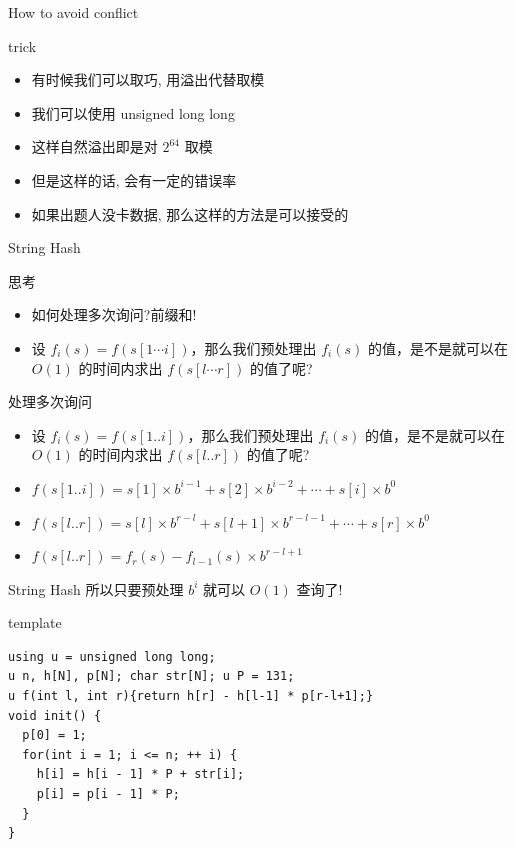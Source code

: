 \documentclass{ldr-simple-gray}
\begin{document}
  \begin{frame}{How to avoid conflict}
    \begin{block}{trick}
      \begin{itemize}
        \item 有时候我们可以取巧, 用溢出代替取模
        \item 我们可以使用 unsigned long long
        \item 这样自然溢出即是对 $2^{64}$ 取模
        \item 但是这样的话, 会有一定的错误率
        \item 如果出题人没卡数据, 那么这样的方法是可以接受的
      \end{itemize}
    \end{block}
  \end{frame}

  \begin{frame}{String Hash}
    \begin{block}{思考}
      \begin{itemize}
        \item 如何处理多次询问?前缀和!
        \item 设 $f_{i}(s)=f(s[1\cdots i])$，那么我们预处理出 $f_{i}(s)$ 的值，是不是就可以在 $O(1)$ 的时间内求出 $f(s[l\cdots r])$ 的值了呢?
      \end{itemize}
    \end{block}

    \begin{block}{处理多次询问}
      \begin{itemize}
        \item 设 $f_{i}(s)=f(s[1..i])$，那么我们预处理出 $f_{i}(s)$ 的值，是不是就可以在 $O(1)$ 的时间内求出 $f(s[l..r])$ 的值了呢?
        \item $f(s[1..i])=s[1]\times{b^{i-1}}+s[2]\times{b^{i-2}}+\cdots+s[i]\times{b^{0}}$
        \item $f(s[l..r])=s[l]\times{b^{r-l}}+s[l+1]\times{b^{r-l-1}}+\cdots+s[r]\times{b^{0}}$
        \item $f(s[l..r])=f_{r}(s)-f_{l-1}(s)\times{b^{r-l+1}}$
      \end{itemize}
    \end{block}
  \end{frame}

  \begin{frame}[fragile]{String Hash}
    所以只要预处理 $b^i$ 就可以 $O(1)$ 查询了!
    \begin{block}{template}
      \begin{verbatim}
using u = unsigned long long;
u n, h[N], p[N]; char str[N]; u P = 131;
u f(int l, int r){return h[r] - h[l-1] * p[r-l+1];} 
void init() {
  p[0] = 1;
  for(int i = 1; i <= n; ++ i) {
    h[i] = h[i - 1] * P + str[i];
    p[i] = p[i - 1] * P;
  }
}\end{verbatim}
    \end{block}
  \end{frame}
\end{document}
